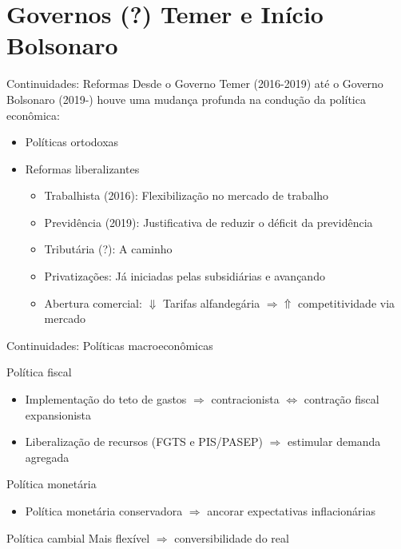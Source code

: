 \documentclass[presentation]{beamer}
\begin{document}
\section{Governos (?) Temer e Início Bolsonaro}
\label{sec:org8da5895}
\begin{frame}[label={sec:orge530860}]{Continuidades: Reformas}
Desde o Governo Temer (2016-2019) até o Governo Bolsonaro (2019-) houve uma mudança profunda na condução da política econômica:
\begin{itemize}
\item Políticas ortodoxas
\item Reformas liberalizantes
\begin{itemize}
\item \alert{Trabalhista (2016):} Flexibilização no mercado de trabalho
\item \alert{Previdência (2019):} Justificativa de reduzir o déficit da previdência
\item \alert{Tributária (?):} A caminho
\item \alert{Privatizações:} Já iniciadas pelas subsidiárias e avançando
\item \alert{Abertura comercial:} \(\Downarrow\) Tarifas alfandegária \(\Rightarrow \Uparrow\) competitividade via mercado
\end{itemize}
\end{itemize}
\end{frame}

\begin{frame}[label={sec:org8b2bc2d}]{Continuidades: Políticas macroeconômicas}
\begin{block}{Política fiscal}
\begin{itemize}
\item Implementação do teto de gastos \(\Rightarrow\) contracionista \(\Leftrightarrow\) contração fiscal expansionista
\item Liberalização de recursos (FGTS e PIS/PASEP) \(\Rightarrow\) estimular demanda agregada
\end{itemize}
\end{block}
\begin{block}{Política monetária}
\begin{itemize}
\item Política monetária conservadora \(\Rightarrow\) ancorar expectativas inflacionárias
\end{itemize}
\end{block}
\begin{block}{Política cambial}
Mais flexível \(\Rightarrow\) conversibilidade do real
\end{block}
\end{frame}
\end{document}
